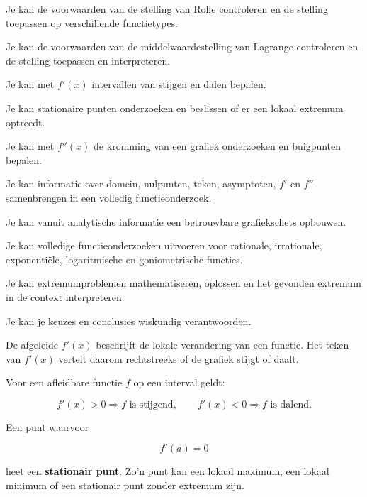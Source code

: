 \documentclass{ximera}
\begin{document}
\begin{leerdoelen}
  \item Je kan de voorwaarden van de stelling van Rolle controleren en de stelling toepassen op verschillende functietypes.
  \item Je kan de voorwaarden van de middelwaardestelling van Lagrange controleren en de stelling toepassen en interpreteren.
  \item Je kan met \(f'(x)\) intervallen van stijgen en dalen bepalen.
  \item Je kan stationaire punten onderzoeken en beslissen of er een lokaal extremum optreedt.
  \item Je kan met \(f''(x)\) de kromming van een grafiek onderzoeken en buigpunten bepalen.
  \item Je kan informatie over domein, nulpunten, teken, asymptoten, \(f'\) en \(f''\) samenbrengen in een volledig functieonderzoek.
  \item Je kan vanuit analytische informatie een betrouwbare grafiekschets opbouwen.
  \item Je kan volledige functieonderzoeken uitvoeren voor rationale, irrationale, exponentiële, logaritmische en goniometrische functies.
  \item Je kan extremumproblemen mathematiseren, oplossen en het gevonden extremum in de context interpreteren.
  \item Je kan je keuzes en conclusies wiskundig verantwoorden.
\end{leerdoelen}



De afgeleide \(f'(x)\) beschrijft de lokale verandering van een functie.
Het teken van \(f'(x)\) vertelt daarom rechtstreeks of de grafiek stijgt
of daalt.

\begin{eigenschap}
Voor een afleidbare functie \(f\) op een interval geldt:

\[
f'(x)>0 \Longrightarrow f \text{ is stijgend},
\qquad
f'(x)<0 \Longrightarrow f \text{ is dalend}.
\]

Een punt waarvoor

\[f'(a)=0\]

heet een \textbf{stationair punt}. Zo'n punt kan een lokaal maximum,
een lokaal minimum of een stationair punt zonder extremum zijn.
\end{eigenschap}
\end{document}
